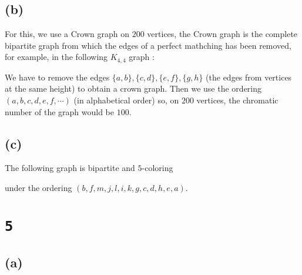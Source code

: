\documentclass[a4paper,11pt]{report}
\begin{document}
\subsection*{(b)}

For this, we use a Crown graph on $200$ vertices, the Crown graph is the
complete bipartite graph from which the edges of a perfect mathching has been
removed, for example, in the following $K_{4,4}$ graph :

\begin{center}
\end{center}

We have to remove the edges $\{a,b\},\{c,d\},\{e,f\},\{g,h\}$ (the edges from
vertices at the same height) to obtain a crown graph. Then we use the ordering
$(a,b,c,d,e,f,\cdots)$ (in alphabetical order) so, on $200$ vertices, the
chromatic number of the graph would be $100$.

\subsection*{(c)}

The following graph is bipartite and $5$-coloring

\begin{center}
\end{center}

under the ordering $(b,f,m,j,l,i,k,g,c,d,h,e,a)$.

\section*{\texttt{5}}

\subsection*{(a)}
\end{document}

